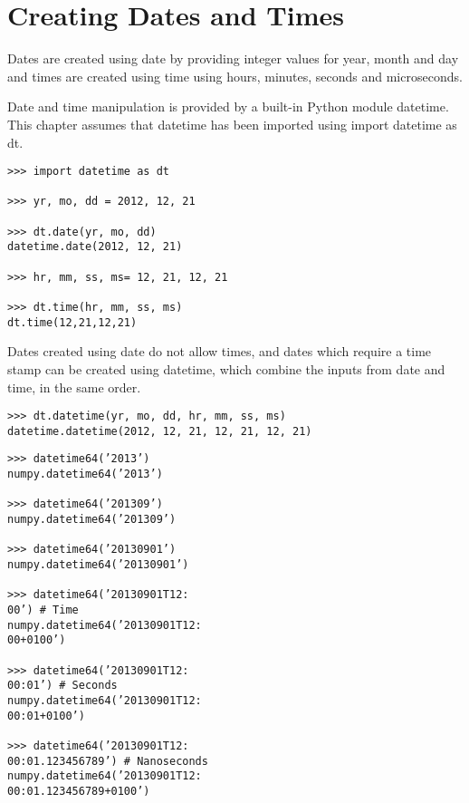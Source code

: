 \documentclass[KSmain.tex]{subfiles}
\begin{document}
 
\section{Creating Dates and Times}

Dates are created using date by providing integer values for year, month and day and times are created
using time using hours, minutes, seconds and microseconds.

Date and time manipulation is provided by a built-in Python module datetime. This chapter assumes that
datetime has been imported using import datetime as dt.

\begin{framed}
\begin{verbatim}
>>> import datetime as dt

>>> yr, mo, dd = 2012, 12, 21

>>> dt.date(yr, mo, dd)
datetime.date(2012, 12, 21)

>>> hr, mm, ss, ms= 12, 21, 12, 21

>>> dt.time(hr, mm, ss, ms)
dt.time(12,21,12,21)

\end{verbatim}
\end{framed}

Dates created using date do not allow times, and dates which require a time stamp can be created using
datetime, which combine the inputs from date and time, in the same order.
\begin{framed}
\begin{verbatim}
>>> dt.datetime(yr, mo, dd, hr, mm, ss, ms)
datetime.datetime(2012, 12, 21, 12, 21, 12, 21)

\end{verbatim}
\end{framed}


\begin{verbatim}
>>> datetime64(’2013’)
numpy.datetime64(’2013’)

>>> datetime64(’201309’)
numpy.datetime64(’201309’)

>>> datetime64(’20130901’)
numpy.datetime64(’20130901’)

>>> datetime64(’20130901T12:
00’) # Time
numpy.datetime64(’20130901T12:
00+0100’)

>>> datetime64(’20130901T12:
00:01’) # Seconds
numpy.datetime64(’20130901T12:
00:01+0100’)

>>> datetime64(’20130901T12:
00:01.123456789’) # Nanoseconds
numpy.datetime64(’20130901T12:
00:01.123456789+0100’)
\end{verbatim}
\end{document}
